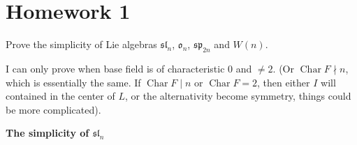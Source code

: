 \section{Homework 1}

\begin{exercise}
    Prove the simplicity of Lie algebras $\mathfrak{sl}_n$, $\mathfrak{o}_n$, $\mathfrak{sp}_{2n}$ and $W(n)$.
\end{exercise}

I can only prove when base field is of characteristic 0 and $\neq 2$. (Or $\operatorname{Char}F \nmid n$, which is essentially the same. If $\operatorname{Char}F \mid n$ or $\operatorname{Char}F = 2$, then either $I$ will contained in the center of $L$, or the alternativity become symmetry, things could be more complicated).

\textbf{The simplicity of $\mathfrak{sl}_n$}

